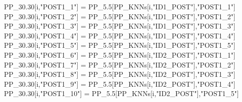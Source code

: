 \documentclass[12pt,twoside]{reedthesis}
\newenvironment{Shaded}{\begin{snugshade}}{\end{snugshade}}
\newcommand{\FloatTok}[1]{\textcolor[rgb]{0.00,0.00,0.81}{#1}}
\newcommand{\NormalTok}[1]{#1}
\newcommand{\StringTok}[1]{\textcolor[rgb]{0.31,0.60,0.02}{#1}}
\begin{document}
\begin{Shaded}
\begin{Highlighting}[]
{\NormalTok{  PP_}\FloatTok{30.30}\NormalTok{[i,}\StringTok{"POST1_1"}\NormalTok{] =}\StringTok{ }\NormalTok{PP_}\FloatTok{5.5}\NormalTok{[PP_KNNs[i,}\StringTok{"ID1_POST"}\NormalTok{],}\StringTok{"POST1_1"}\NormalTok{]}
\NormalTok{  PP_}\FloatTok{30.30}\NormalTok{[i,}\StringTok{"POST1_2"}\NormalTok{] =}\StringTok{ }\NormalTok{PP_}\FloatTok{5.5}\NormalTok{[PP_KNNs[i,}\StringTok{"ID1_POST"}\NormalTok{],}\StringTok{"POST1_2"}\NormalTok{]}
\NormalTok{  PP_}\FloatTok{30.30}\NormalTok{[i,}\StringTok{"POST1_3"}\NormalTok{] =}\StringTok{ }\NormalTok{PP_}\FloatTok{5.5}\NormalTok{[PP_KNNs[i,}\StringTok{"ID1_POST"}\NormalTok{],}\StringTok{"POST1_3"}\NormalTok{]}
\NormalTok{  PP_}\FloatTok{30.30}\NormalTok{[i,}\StringTok{"POST1_4"}\NormalTok{] =}\StringTok{ }\NormalTok{PP_}\FloatTok{5.5}\NormalTok{[PP_KNNs[i,}\StringTok{"ID1_POST"}\NormalTok{],}\StringTok{"POST1_4"}\NormalTok{]}
\NormalTok{  PP_}\FloatTok{30.30}\NormalTok{[i,}\StringTok{"POST1_5"}\NormalTok{] =}\StringTok{ }\NormalTok{PP_}\FloatTok{5.5}\NormalTok{[PP_KNNs[i,}\StringTok{"ID1_POST"}\NormalTok{],}\StringTok{"POST1_5"}\NormalTok{]}
\NormalTok{  PP_}\FloatTok{30.30}\NormalTok{[i,}\StringTok{"POST1_6"}\NormalTok{] =}\StringTok{ }\NormalTok{PP_}\FloatTok{5.5}\NormalTok{[PP_KNNs[i,}\StringTok{"ID2_POST"}\NormalTok{],}\StringTok{"POST1_1"}\NormalTok{]}
\NormalTok{  PP_}\FloatTok{30.30}\NormalTok{[i,}\StringTok{"POST1_7"}\NormalTok{] =}\StringTok{ }\NormalTok{PP_}\FloatTok{5.5}\NormalTok{[PP_KNNs[i,}\StringTok{"ID2_POST"}\NormalTok{],}\StringTok{"POST1_2"}\NormalTok{]}
\NormalTok{  PP_}\FloatTok{30.30}\NormalTok{[i,}\StringTok{"POST1_8"}\NormalTok{] =}\StringTok{ }\NormalTok{PP_}\FloatTok{5.5}\NormalTok{[PP_KNNs[i,}\StringTok{"ID2_POST"}\NormalTok{],}\StringTok{"POST1_3"}\NormalTok{]}
\NormalTok{  PP_}\FloatTok{30.30}\NormalTok{[i,}\StringTok{"POST1_9"}\NormalTok{] =}\StringTok{ }\NormalTok{PP_}\FloatTok{5.5}\NormalTok{[PP_KNNs[i,}\StringTok{"ID2_POST"}\NormalTok{],}\StringTok{"POST1_4"}\NormalTok{]}
\NormalTok{  PP_}\FloatTok{30.30}\NormalTok{[i,}\StringTok{"POST1_10"}\NormalTok{] =}\StringTok{ }\NormalTok{PP_}\FloatTok{5.5}\NormalTok{[PP_KNNs[i,}\StringTok{"ID2_POST"}\NormalTok{],}\StringTok{"POST1_5"}\NormalTok{]}

}
\end{Highlighting}
\end{Shaded}
\end{document}
